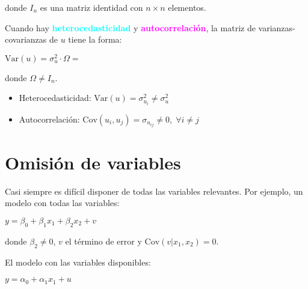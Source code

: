 \documentclass[10pt, a4paper, landscape]{extarticle}
\newcommand{\Var}{\mathrm{Var}}
\newcommand{\Cov}{\mathrm{Cov}}
\begin{document}
\begin{multicols}{3}
\quad donde $I_n$ es una matriz identidad con $n \times n$ elementos.

Cuando hay \textcolor{cyan}{\textbf{heterocedasticidad}} y \textcolor{magenta}{\textbf{autocorrelación}}, la matriz de varianzas-covarianzas de $u$ tiene la forma:

\begin{center}
	$\Var(u) = \sigma^2_u \cdot \Omega =$
\end{center}

\quad donde $\Omega \neq I_n$.

\begin{itemize}[leftmargin=*]
	\item Heterocedasticidad: $\Var(u) = \sigma^2_{u_i} \neq \sigma^2_u$
	\item Autocorrelación: $\Cov(u_i, u_j) = \sigma_{u_{ij}} \neq 0, \; \forall i \neq j$
\end{itemize}

\section*{Omisión de variables}

Casi siempre es difícil disponer de todas las variables relevantes. Por ejemplo, un modelo con todas las variables:

\begin{center}
	$y = \beta_0 + \beta_1 x_1 + \beta_2 x_2 + v$
\end{center}

\quad donde $\beta_2 \neq 0$, $v$ el término de error y $\Cov(v|x_1,x_2) = 0$.

El modelo con las variables disponibles:

\begin{center}
	$y = \alpha_0 + \alpha_1 x_1 + u$
\end{center}


\end{multicols}
\end{document}
